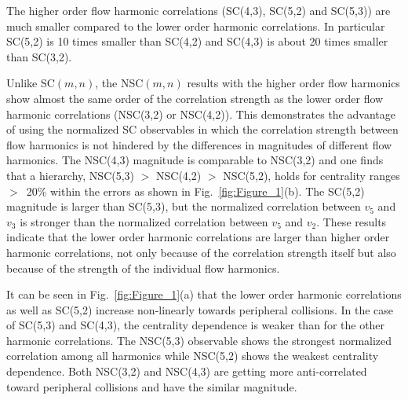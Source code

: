The higher order flow harmonic correlations (SC(4,3), SC(5,2) and SC(5,3)) are much smaller compared to the lower order harmonic correlations.
In particular SC(5,2) is 10 times smaller than SC(4,2) and SC(4,3) is about 20 times smaller than SC(3,2).

Unlike SC$(m,n)$, the NSC$(m,n)$ results with the higher order flow harmonics show almost the same order of the correlation strength as the lower order flow harmonic correlations (NSC(3,2) or NSC(4,2)).
This demonstrates the advantage of using the normalized SC observables in which the correlation strength between flow harmonics is not hindered by the differences in magnitudes of different flow harmonics. The NSC(4,3) magnitude is comparable to NSC(3,2) and one finds that a hierarchy, NSC(5,3) $>$ NSC(4,2) $>$ NSC(5,2), holds for centrality ranges $>$~20\% within the errors as shown in Fig.~\ref{fig:Figure_1}(b).
The SC(5,2) magnitude is larger than SC(5,3), but the normalized correlation between $v_5$ and $v_3$ is stronger than the normalized correlation between $v_5$ and $v_2$. 
These results indicate that the lower order harmonic correlations are larger than higher order harmonic correlations, not only because of the correlation strength itself but also because of the strength of the individual flow harmonics.

It can be seen in Fig.~\ref{fig:Figure_1}(a) that the lower order harmonic correlations as well as SC(5,2) increase non-linearly towards peripheral collisions.
In the case of SC(5,3) and SC(4,3), the centrality dependence is weaker than for the other harmonic correlations.
The NSC(5,3) observable shows the strongest normalized correlation among all harmonics while NSC(5,2) shows the weakest centrality dependence.
Both NSC(3,2) and NSC(4,3) are getting more anti-correlated toward peripheral collisions and have the similar magnitude.

